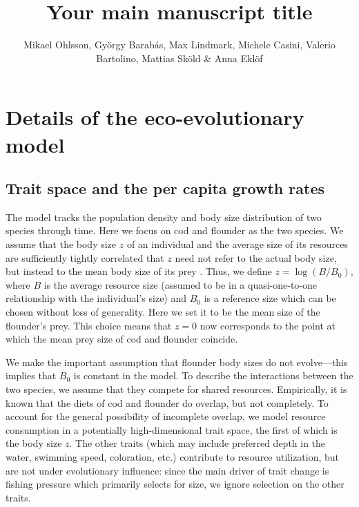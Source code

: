 \documentclass[9pt,twoside,lineno]{pnas-new}
\title{Your main manuscript title}
\author{Mikael Ohlsson, György Barabás, Max Lindmark, Michele Casini, Valerio Bartolino, Mattias Sköld \& Anna Eklöf}
\begin{document}

\maketitle

\SItext


\bigskip

\section*{Details of the eco-evolutionary model} \label{sec:si_ecoevo}

\subsection*{Trait space and the per capita growth rates}

The model tracks the population density and body size distribution of two species through time. Here we focus on cod and flounder as the two species. We assume that the body size $z$ of an individual and the average size of its resources are sufficiently tightly correlated that $z$ need not refer to the actual body size, but instead to the mean body size of its prey \citep{Rossberg2013, Schneideretal2016}. Thus, we define $z = \log(B/B_0)$, where $B$ is the average resource size (assumed to be in a quasi-one-to-one relationship with the individual's size) and $B_0$ is a reference size which can be chosen without loss of generality. Here we set it to be the mean size of the flounder's prey. This choice means that $z = 0$ now corresponds to the point at which the mean prey size of cod and flounder coincide.

We make the important assumption that flounder body sizes do not evolve---this implies that $B_0$ is constant in the model. To describe the interactions between the two species, we assume that they compete for shared resources. Empirically, it is known that the diets of cod and flounder do overlap, but not completely. To account for the general possibility of incomplete overlap, we model resource consumption in a potentially high-dimensional trait space, the first of which is the body size $z$. The other traits (which may include preferred depth in the water, swimming speed, coloration, etc.) contribute to resource utilization, but are not under evolutionary influence: since the main driver of trait change is fishing pressure which primarily selects for size, we ignore selection on the other traits.
\end{document}
